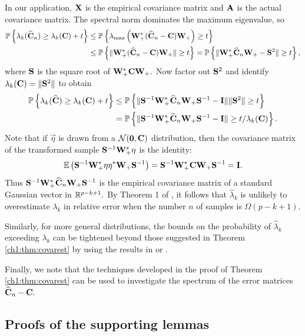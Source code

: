 In our application, $\mathbf{X}$ is the empirical covariance matrix and $\mathbf{A}$
is the actual covariance matrix. The spectral norm dominates the maximum
eigenvalue, so 
\begin{align*}
 \mathbb{P}\left\{\lambda_k(\widehat{\mathbf{C}}_n) \geq \lambda_k(\mathbf{C}) + t\right\} & \leq
\mathbb{P}\left\{\lambda_{\mathrm{max}}\left(\mathbf{W}_+^*(\widehat{\mathbf{C}}_n - \mathbf{C})\mathbf{W}_+\right) \geq
t\right\}\\
& \leq \mathbb{P}\left\{\|\mathbf{W}_+^* (\widehat{\mathbf{C}}_n - \mathbf{C}) \mathbf{W}_+\| \geq
t\right\} = \mathbb{P}\left\{\|\mathbf{W}_+^* \widehat{\mathbf{C}}_n \mathbf{W}_+ - \mathbf{S}^2 \| \geq t
\right\},
\end{align*}
where $\mathbf{S}$ is the square root of $\mathbf{W}_+^* \mathbf{C} \mathbf{W}_+.$ Now
factor out $\mathbf{S}^2$ and identify $\lambda_k(\mathbf{C}) = \|\mathbf{S}^2\|$ to
obtain
\begin{align*}
 \mathbb{P}\left\{\lambda_k(\widehat{\mathbf{C}}) \geq \lambda_k(\mathbf{C}) + t\right\} & \leq
\mathbb{P}\left\{\|\mathbf{S}^{-1} \mathbf{W}_+^* \widehat{\mathbf{C}}_n \mathbf{W}_+ \mathbf{S}^{-1}
- \mathbf{I} \| \|\mathbf{S}^2\| \geq t \right\} \\
 & = \mathbb{P}\left\{\|\mathbf{S}^{-1} \mathbf{W}_+^* \widehat{\mathbf{C}}_n \mathbf{W}_+
\mathbf{S}^{-1} - \mathbf{I} \| \geq t/\lambda_k(\mathbf{C})\right\}.
\end{align*}
Note that if $\vec{\eta}$ is drawn from a $\mathcal{N}(\mathbf{0}, \mathbf{C})$
distribution, then the covariance matrix of the transformed sample
$\mathbf{S}^{-1}\mathbf{W}_+^* \mathbf{\eta}$ is the identity:
\[
\mathbb{E} \left(\mathbf{S}^{-1}\mathbf{W}_+^* \mathbf{\eta} \mathbf{\eta}^* \mathbf{W}_+
\mathbf{S}^{-1}\right) = \mathbf{S}^{-1} \mathbf{W}_+^* \mathbf{C} \mathbf{W}_+
\mathbf{S}^{-1} = \mathbf{I}.
\]
Thus $\mathbf{S}^{-1} \mathbf{W}_+^* \widehat{\mathbf{C}}_n \mathbf{W}_+ \mathbf{S}^{-1}$
is the empirical covariance matrix of a standard Gaussian vector in
$\mathbb{R}^{p-k+1}.$ By Theorem 1 of \cite{ALPT10b}, it follows that $\hat{\lambda}_k$
is unlikely to overestimate $\lambda_k$ in relative error when the number $n$ of
samples is $\Omega(p-k+1).$

Similarly, for more general distributions, the bounds on the probability of
$\hat{\lambda}_k$ exceeding $\lambda_k$ can be tightened beyond those suggested
in Theorem \ref{ch1:thm:covarest} by using the results in \cite{ALPT10b} or
\cite{V10}.

Finally, we note that the techniques developed in the proof of Theorem
\ref{ch1:thm:covarest} can be used to investigate the spectrum of the error matrices
$\widehat{\mathbf{C}}_n - \mathbf{C}.$
\subsection{Proofs of the supporting lemmas}


